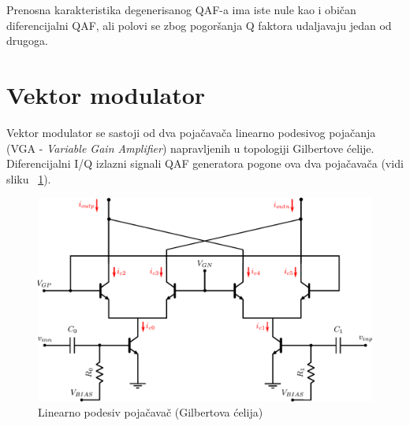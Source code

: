 \documentclass[journal,twocolumn,letterpaper]{IEEEJERM}
\begin{document}
Prenosna karakteristika degenerisanog QAF-a ima iste nule kao i običan diferencijalni QAF, ali polovi se zbog pogoršanja Q faktora udaljavaju jedan od drugoga. \\



\section{Vektor modulator}

Vektor modulator se sastoji od dva pojačavača linearno podesivog pojačanja (VGA - \textit{Variable Gain Amplifier}) napravljenih u topologiji Gilbertove ćelije. Diferencijalni I/Q izlazni signali QAF generatora pogone ova dva pojačavača (vidi sliku ~\ref{fig:vga_vmod}).

\begin{figure}[!htbp]
  \centering
  \includegraphics[width=\linewidth]{vga_vmod.pdf}
  \caption{Linearno podesiv pojačavač (Gilbertova ćelija)}
  \label{fig:vga_vmod}
\end{figure}
\end{document}
